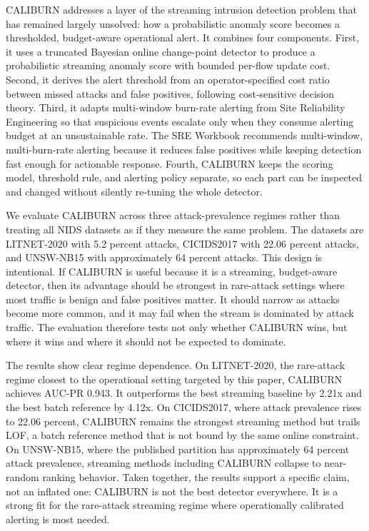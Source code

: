 \documentclass[preprint,12pt,authoryear]{elsarticle}
\newcommand{\caliburn}{CALIBURN}
\begin{document}
\caliburn{} addresses a layer of the streaming intrusion detection problem that has remained largely unsolved: how a probabilistic anomaly score becomes a thresholded, budget-aware operational alert. It combines four components. First, it uses a truncated Bayesian online change-point detector to produce a probabilistic streaming anomaly score with bounded per-flow update cost. Second, it derives the alert threshold from an operator-specified cost ratio between missed attacks and false positives, following cost-sensitive decision theory. Third, it adapts multi-window burn-rate alerting from Site Reliability Engineering so that suspicious events escalate only when they consume alerting budget at an unsustainable rate. The SRE Workbook \citep{beyer2018workbook} recommends multi-window, multi-burn-rate alerting because it reduces false positives while keeping detection fast enough for actionable response. Fourth, \caliburn{} keeps the scoring model, threshold rule, and alerting policy separate, so each part can be inspected and changed without silently re-tuning the whole detector.

We evaluate \caliburn{} across three attack-prevalence regimes rather than treating all NIDS datasets as if they measure the same problem. The datasets are LITNET-2020 with 5.2 percent attacks, CICIDS2017 with 22.06 percent attacks, and UNSW-NB15 with approximately 64 percent attacks. This design is intentional. If \caliburn{} is useful because it is a streaming, budget-aware detector, then its advantage should be strongest in rare-attack settings where most traffic is benign and false positives matter. It should narrow as attacks become more common, and it may fail when the stream is dominated by attack traffic. The evaluation therefore tests not only whether \caliburn{} wins, but where it wins and where it should not be expected to dominate.

The results show clear regime dependence. On LITNET-2020, the rare-attack regime closest to the operational setting targeted by this paper, \caliburn{} achieves AUC-PR 0.943. It outperforms the best streaming baseline by 2.21x and the best batch reference by 4.12x. On CICIDS2017, where attack prevalence rises to 22.06 percent, \caliburn{} remains the strongest streaming method but trails LOF, a batch reference method that is not bound by the same online constraint. On UNSW-NB15, where the published partition has approximately 64 percent attack prevalence, streaming methods including \caliburn{} collapse to near-random ranking behavior. Taken together, the results support a specific claim, not an inflated one: \caliburn{} is not the best detector everywhere. It is a strong fit for the rare-attack streaming regime where operationally calibrated alerting is most needed.
\end{document}
